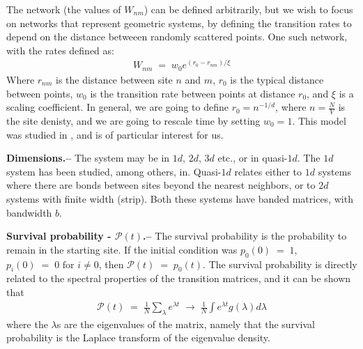 The network (the values of $W_{nm}$) can be defined arbitrarily, but we wish to focus on networks that represent geometric systems, by defining the transition rates to depend on the distance betweeen randomly scattered points\cite{Mezard:1999:NPB}. One such network, with the rates defined as:
\begin{align} \label{eq:exp_rates}
  W_{nm}\;=\; w_0 e^{(r_0-r_{nm})/ \xi}
\end{align}
Where $r_{nm}$ is the distance between site $n$ and $m$, $r_0$ is the typical distance between points, $w_0$ is the transition rate between points at distance $r_0$, and $\xi$ is a scaling coefficient. In general, we are going to define $r_0 = n^{-1/d}$, where $n=\frac{N}{V}$ is the site denisty, and we are going to rescale time by setting $w_0=1$. This model was studied in \cite{Amir:2010:PRL}, and is of particular interest for us.

{ \bf Dimensions.-- } The system may be in $1d$, $2d$, $3d$ etc., or in quasi-$1d$. The $1d$ system has been studied, among others, in\cite{Parris:1986}\cite{Alexander:1981:RMP}\cite{AslangulChvosta:1995}.  Quasi-$1d$ relates either to $1d$ systems where there are bonds between sites beyond the nearest neighbors, or to $2d$ systems with finite width (strip). Both these systems have banded matrices, with bandwidth $b$.

{ \bf Survival probability - $\mathcal{P}(t)$.--} 
The survival probability is the probability to remain in the starting site. If the initial condition was $p_0(0)\;=\;1$, $p_i(0)\;=\;0 \textrm{  for  } i\neq 0$, then $\mathcal{P}(t)\;=\; p_0(t)$. The survival probability is directly related to the spectral properties of the transition matrices, and it can be shown that 
\begin{align} \label{eq:p_t_spectrum}
\mathcal{P}(t) \;=\; \frac{1}{N}\sum_\lambda e^{\lambda t} \;\rightarrow\;\frac{1}{N}\int e^{\lambda t}g(\lambda)d\lambda
\end{align}
where the $\lambda$s are the eigenvalues of the matrix, namely that the survival probability is the Laplace transform of the eigenvalue density.

